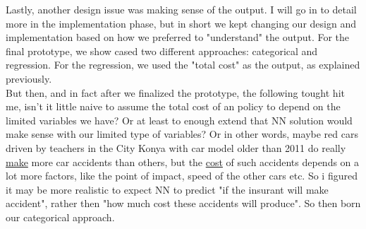 \documentclass[titlepage, a4paper, 14pt]{extarticle} %
\begin{document}
Lastly, another design issue was making sense of the output. I will go in to detail more in the implementation phase, but in short we kept changing our design and implementation based on how we preferred to "understand" the output. For the final prototype, we show cased two different approaches: categorical and regression. For the regression, we used the "total cost" as the output, as explained previously. \\ 

But then, and in fact after we finalized the prototype, the following tought hit me, isn't it little naive to assume the total cost of an policy to depend on the limited variables we have? Or at least to enough extend that NN solution would make sense with our limited type of variables? Or in other words, maybe red cars driven by teachers in the City Konya with car model older than 2011 do really \underline{make} more car accidents than others, but the \underline{cost} of such accidents depends on a lot more factors, like the point of impact, speed of the other cars etc. So i figured it may be more realistic to expect NN to predict "if the insurant will make accident", rather then "how much cost these accidents will produce". So then born our categorical approach. \\ 
\end{document}
